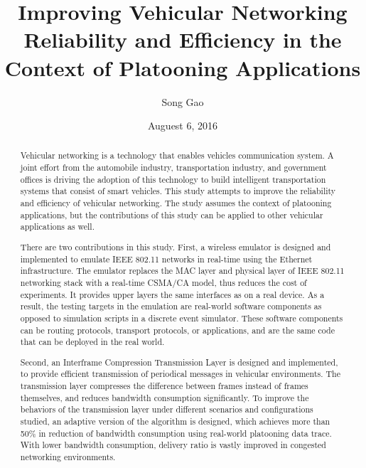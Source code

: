 \documentclass[12pt]{report}
\title{Improving Vehicular Networking Reliability and Efficiency in the Context of Platooning Applications}
\author{Song Gao}
\date{Auguest 6, 2016} %
\begin{document}
\begin{romanpages}      %

\TitlePage

\begin{abstract} 
  Vehicular networking is a technology that enables vehicles communication system. A joint effort from the automobile industry, transportation industry, and government offices is driving the adoption of this technology to build intelligent transportation systems that consist of smart vehicles. This study attempts to improve the reliability and efficiency of vehicular networking. The study assumes the context of platooning applications, but the contributions of this study can be applied to other vehicular applications as well.

  There are two contributions in this study. First, a wireless emulator is designed and implemented to emulate IEEE 802.11 networks in real-time using the Ethernet infrastructure. The emulator replaces the MAC layer and physical layer of IEEE 802.11 networking stack with a real-time CSMA/CA model, thus reduces the cost of experiments. It provides upper layers the same interfaces as on a real device. As a result, the testing targets in the emulation are real-world software components as opposed to simulation scripts in a discrete event simulator. These software components can be routing protocols, transport protocols, or applications, and are the same code that can be deployed in the real world.

  Second, an Interframe Compression Transmission Layer is designed and implemented, to provide efficient transmission of periodical messages in vehicular environments. The transmission layer compresses the difference between frames instead of frames themselves, and reduces bandwidth consumption significantly. To improve the behaviors of the transmission layer under different scenarios and configurations studied, an adaptive version of the algorithm is designed, which achieves more than 50\% in reduction of bandwidth consumption using real-world platooning data trace. With lower bandwidth consumption, delivery ratio is vastly improved in congested networking environments.
\end{abstract}



\tableofcontents
\listoffigures
\listoftables

\printnomenclature[1.0in] %
\end{romanpages}        %
\end{document}
